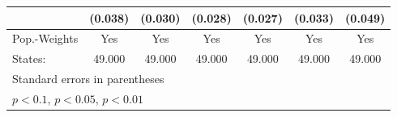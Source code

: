 {\begin{tabular}{l*{6}{c}}
            &     (0.038)         &     (0.030)         &     (0.028)         &     (0.027)         &     (0.033)         &     (0.049)         \\
\hline
Pop.-Weights&         Yes         &         Yes         &         Yes         &         Yes         &         Yes         &         Yes         \\
States:     &      49.000         &      49.000         &      49.000         &      49.000         &      49.000         &      49.000         \\
\hline\hline
\multicolumn{7}{l}{\footnotesize Standard errors in parentheses}\\
\multicolumn{7}{l}{\footnotesize \sym{*} \(p<0.1\), \sym{**} \(p<0.05\), \sym{***} \(p<0.01\)}\\
\end{tabular}
}
